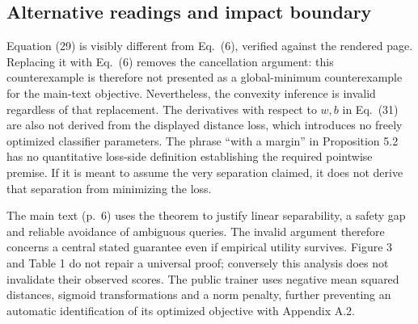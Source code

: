 \documentclass[10pt]{article}
\begin{document}
\subsection*{Alternative readings and impact boundary}
Equation (29) is visibly different from Eq. (6), verified against the rendered page. Replacing it with Eq. (6) removes the cancellation argument: this counterexample is therefore not presented as a global-minimum counterexample for the main-text objective. Nevertheless, the convexity inference is invalid regardless of that replacement. The derivatives with respect to \(w,b\) in Eq. (31) are also not derived from the displayed distance loss, which introduces no freely optimized classifier parameters. The phrase “with a margin” in Proposition 5.2 has no quantitative loss-side definition establishing the required pointwise premise. If it is meant to assume the very separation claimed, it does not derive that separation from minimizing the loss.\par
The main text (p. 6) uses the theorem to justify linear separability, a safety gap and reliable avoidance of ambiguous queries. The invalid argument therefore concerns a central stated guarantee even if empirical utility survives. Figure 3 and Table 1 do not repair a universal proof; conversely this analysis does not invalidate their observed scores. The public trainer uses negative mean squared distances, sigmoid transformations and a norm penalty, further preventing an automatic identification of its optimized objective with Appendix A.2.\par
\end{document}
